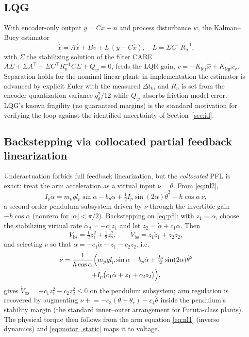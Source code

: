 \documentclass[conference]{IEEEtran}
\begin{document}
\subsection{LQG}
With encoder-only output $y = Cx + n$ and process disturbance $w$, the Kalman--Bucy estimator
\begin{equation}
\dot{\hat x} = A\hat x + Bv + L\,(y - C\hat x),\quad
L = \Sigma C^{\!\top} R_n^{-1},
\end{equation}
with $\Sigma$ the stabilizing solution of the filter CARE
$A\Sigma + \Sigma A^{\!\top} - \Sigma C^{\!\top}R_n^{-1}C\Sigma + Q_w = 0$,
feeds the LQR gain, $v = -K_{\mathrm{lqr}}\hat x + K_{\mathrm{lqr}}x_r$. Separation holds for the nominal linear plant; in implementation the estimator is advanced by explicit Euler with the measured $\Delta t_k$, and $R_n$ is set from the encoder quantization variance $q_\theta^2/12$ while $Q_w$ absorbs friction-model error. LQG's known fragility (no guaranteed margins) is the standard motivation for verifying the loop against the identified uncertainty of Section~\ref{sec:id}.

\subsection{Backstepping via collocated partial feedback linearization}\label{sec:bs}
Underactuation forbids full feedback linearization, but the \emph{collocated} PFL is exact: treat the arm acceleration as a virtual input $\nu = \ddot\theta$. From \eqref{eq:nl2},
\begin{equation}
I_p\ddot\alpha = m_p g l_p\sin\alpha - b_p\dot\alpha + \tfrac12 I_p\sin(2\alpha)\dot\theta^2 - h\cos\alpha\,\nu ,
\label{eq:pfl}
\end{equation}
a second-order pendulum subsystem driven by $\nu$ through the invertible gain $-h\cos\alpha$ (nonzero for $|\alpha|<\pi/2$). Backstepping on \eqref{eq:pfl}: with $z_1 = \alpha$, choose the stabilizing virtual rate $\dot\alpha_d = -c_1 z_1$ and let $z_2 = \dot\alpha + c_1\alpha$. Then
\begin{equation}
V_{\mathrm{bs}} = \tfrac12 z_1^2 + \tfrac12 z_2^2,\qquad
\dot V_{\mathrm{bs}} = z_1\dot z_1 + z_2\dot z_2 ,
\end{equation}
and selecting $\nu$ so that $\ddot\alpha = -c_1\dot\alpha - z_1 - c_2 z_2$, i.e.
\begin{multline}
\nu = \frac{1}{h\cos\alpha}\Bigl(m_p g l_p\sin\alpha - b_p\dot\alpha + \tfrac{I_p}{2}\sin(2\alpha)\dot\theta^2 \\
+ I_p\bigl(c_1\dot\alpha + z_1 + c_2 z_2\bigr)\Bigr),
\end{multline}
gives $\dot V_{\mathrm{bs}} = -c_1 z_1^2 - c_2 z_2^2 \le 0$ on the pendulum subsystem; arm regulation is recovered by augmenting $\nu \mathrel{+}= -c_3(\theta-\theta_r) - c_4\dot\theta$ inside the pendulum's stability margin (the standard inner--outer arrangement for Furuta-class plants). The physical torque then follows from the arm equation \eqref{eq:nl1} (inverse dynamics) and \eqref{eq:motor_static} maps it to voltage.
\end{document}
